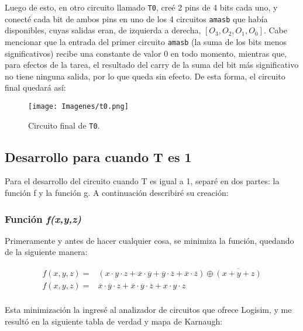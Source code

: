 \documentclass[a4paper,11pt]{article}
\begin{document}
Luego de esto, en otro circuito llamado \texttt{T0}, creé 2 pins de 4 bits cada uno, y conecté cada bit de ambos pins en uno de los 4 circuitos \texttt{amasb} que había disponibles, cuyas salidas eran, de izquierda a derecha, $[O_3,O_2,O_1,O_0]$. Cabe mencionar que la entrada del primer circuito \texttt{amasb} (la suma de los bits menos significativos) recibe una constante de valor 0 en todo momento, mientras que, para efectos de la tarea, el resultado del carry de la suma del bit más significativo no tiene ninguna salida, por lo que queda sin efecto. De esta forma, el circuito final quedará así:
\begin{figure}[h]
    \centering
    \texttt{[image: Imagenes/t0.png]}
    \caption{Circuito final de \texttt{T0}.}
    \label{fig:t0}
\end{figure}

\subsection{Desarrollo para cuando T es 1}
Para el desarrollo del circuito cuando T es igual a 1, separé en dos partes: la función f y la función g. A continuación describiré su creación:

\subsubsection{Función \textit{f(x,y,z)}}

Primeramente y antes de hacer cualquier cosa, se minimiza la función, quedando de la siguiente manera:

\begin{align*}
    f(x,y,z) =& (x \cdot y \cdot z + \overline{x} \cdot \overline{y} + \overline{y} \cdot \overline{z} + \overline{x} \cdot \overline{z}) \oplus \overline{(x+y+z)}\\
    f(x,y,z) =& \overline{x} \cdot \overline{y} \cdot z + \overline{x} \cdot \overline{y} \cdot \overline{z} + x \cdot y \cdot z\\
\end{align*}

Esta minimización la ingresé al analizador de circuitos que ofrece Logisim, y me resultó en la siguiente tabla de verdad y mapa de Karnaugh:
\end{document}

